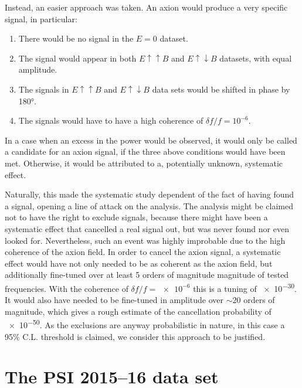 Instead, an easier approach was taken. An axion would produce a very specific signal, in particular:
\begin{enumerate}
  \item There would be no signal in the $E=0$ dataset.
  \item The signal would appear in both $E \uparrow \uparrow B$ and $E \uparrow \downarrow B$ datasets, with equal amplitude.
  \item The signals in $E \uparrow \uparrow B$ and $E \uparrow \downarrow B$ data sets would be shifted in phase by \ang{180}.
  \item The signals would have to have a high coherence of $\delta f / f = 10^{-6}$.
\end{enumerate}
In a case when an excess in the power would be observed, it would only be called a candidate for an axion signal, if the three above conditions would have been met. Otherwise, it would be attributed to a, potentially unknown, systematic effect.

Naturally, this made the systematic study dependent of the fact of having found a signal, opening a line of attack on the analysis. The analysis might be claimed not to have the right to exclude signals, because there might have been a systematic effect that cancelled a real signal out, but was never found nor even looked for. Nevertheless, such an event was highly improbable due to the high coherence of the axion field. In order to cancel the axion signal, a systematic effect would have not only needed to be as coherent as the axion field, but additionally fine-tuned over at least 5 orders of magnitude magnitude of tested frequencies. With the coherence of $\delta f / f = \num{e-6}$ this is a tuning of \num{e-30}. It would also have needed to be fine-tuned in amplitude over $\sim 20$ orders of magnitude, which gives a rough estimate of the cancellation probability of \num{e-50}. As the exclusions are anyway probabilistic in nature, in this case a 95\% C.L. threshold is claimed, we consider this approach to be justified.




\section{The PSI 2015--16 data set}


